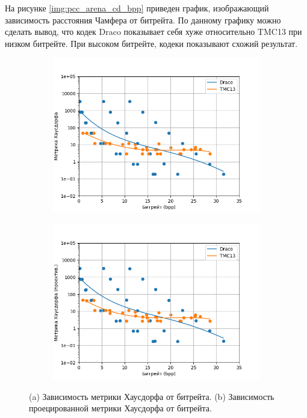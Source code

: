 На рисунке \ref{img:pcc_arena_cd_bpp} приведен график, изображающий зависимость
расстояния Чамфера от битрейта. По данному графику можно сделать вывод, что
кодек Draco показывает себя хуже относительно TMC13 при низком битрейте. При
высоком битрейте, кодеки показывают схожий результат.

\begin{figure}[H]
    \centering
    \begin{subfigure}{0.49\textwidth}
        \includegraphics[width=\linewidth]{assets/pcc_arena/approx_h_p2pt.png}
        \caption{}
    \end{subfigure}
    \begin{subfigure}{0.49\textwidth}
        \includegraphics[width=\linewidth]{assets/pcc_arena/approx_h_p2pl.png}
        \caption{}
    \end{subfigure}
    \caption{ (a) Зависимость метрики Хаусдорфа от битрейта. (b) Зависимость
    проецированной метрики Хаусдорфа от битрейта. }
    \label{img:pcc_arena_hd}
\end{figure}

